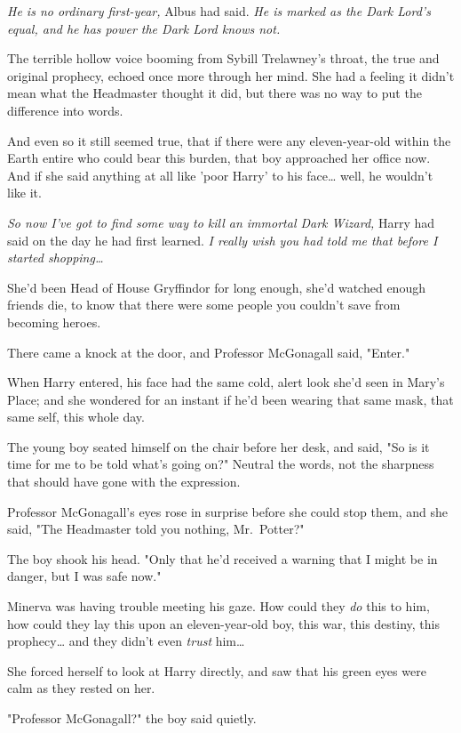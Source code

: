 \emph{He is no ordinary first-year,} Albus had said. \emph{He is marked as the 
Dark Lord's equal, and he has power the Dark Lord knows not.}

The terrible hollow voice booming from Sybill Trelawney's throat, the true and 
original prophecy, echoed once more through her mind. She had a feeling it 
didn't mean what the Headmaster thought it did, but there was no way to put the 
difference into words.

And even so it still seemed true, that if there were any eleven-year-old within 
the Earth entire who could bear this burden, that boy approached her office 
now. And if she said anything at all like 'poor Harry' to his face{\ldots} 
well, he wouldn't like it.

\emph{So now I've got to find some way to kill an immortal Dark Wizard,} Harry 
had said on the day he had first learned.\emph{ I really wish you had told me 
that before I started shopping{\ldots}}

She'd been Head of House Gryffindor for long enough, she'd watched enough 
friends die, to know that there were some people you couldn't save from 
becoming heroes.

There came a knock at the door, and Professor McGonagall said, "Enter."

When Harry entered, his face had the same cold, alert look she'd seen in Mary's 
Place; and she wondered for an instant if he'd been wearing that same mask, 
that same self, this whole day.

The young boy seated himself on the chair before her desk, and said, "So is it 
time for me to be told what's going on?" Neutral the words, not the sharpness 
that should have gone with the expression.

Professor McGonagall's eyes rose in surprise before she could stop them, and 
she said, "The Headmaster told you nothing, Mr.~Potter?"

The boy shook his head. "Only that he'd received a warning that I might be in 
danger, but I was safe now."

Minerva was having trouble meeting his gaze. How could they \emph{do} this to 
him, how could they lay this upon an eleven-year-old boy, this war, this 
destiny, this prophecy{\ldots} and they didn't even \emph{trust} him{\ldots}

She forced herself to look at Harry directly, and saw that his green eyes were 
calm as they rested on her.

"Professor McGonagall?" the boy said quietly.

